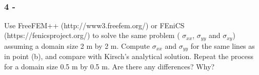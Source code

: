 \documentclass[8pt]{extarticle}
\begin{document}
    \begin{center}
    \end{center}
    { \hspace*{\fill} \\}
    
    \hypertarget{section*}{%
\subsubsection*{4 -}\label{section}}

Use FreeFEM++ (http://www3.freefem.org/) or FEniCS
(https://fenicsproject.org/) to solve the same problem (
\(\sigma_{xx}\), \(\sigma_{yy}\) and \(\sigma_{xy}\)) assuming a domain
size 2 m by 2 m. Compute \(\sigma_{xx}\) and \(\sigma_{yy}\) for the
same lines as in point (b), and compare with Kirsch's analytical
solution. Repeat the process for a domain size 0.5 m by 0.5 m. Are there
any differences? Why?
\end{document}
